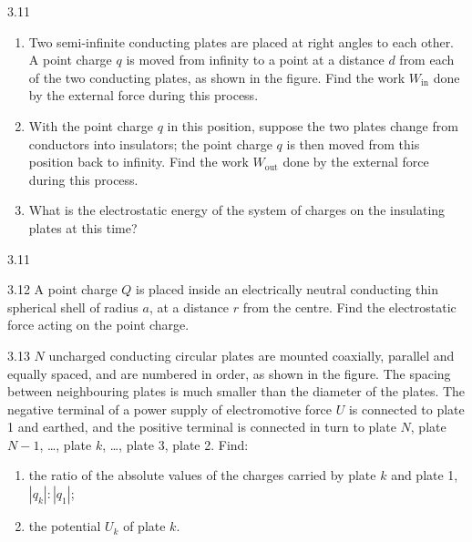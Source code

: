 \begin{problem}{3.11}
\begin{enumerate}[label=(\arabic*),leftmargin=2.2em,itemsep=1pt,topsep=2pt]
\item Two semi-infinite conducting plates are placed at right angles to each other. A point charge $q$ is moved from infinity to a point at a distance $d$ from each of the two conducting plates, as shown in the figure. Find the work $W_{\text{in}}$ done by the external force during this process.
\item With the point charge $q$ in this position, suppose the two plates change from conductors into insulators; the point charge $q$ is then moved from this position back to infinity. Find the work $W_{\text{out}}$ done by the external force during this process.
\item What is the electrostatic energy of the system of charges on the insulating plates at this time?
\end{enumerate}
\end{problem}

\begin{figbox}{3.11}
\end{figbox}

\begin{problem}{3.12}
A point charge $Q$ is placed inside an electrically neutral conducting thin spherical shell of radius $a$, at a distance $r$ from the centre. Find the electrostatic force acting on the point charge.
\end{problem}

\begin{problem}{3.13}
$N$ uncharged conducting circular plates are mounted coaxially, parallel and equally spaced, and are numbered in order, as shown in the figure. The spacing between neighbouring plates is much smaller than the diameter of the plates. The negative terminal of a power supply of electromotive force $U$ is connected to plate 1 and earthed, and the positive terminal is connected in turn to plate $N$, plate $N-1$, \dots, plate $k$, \dots, plate 3, plate 2. Find:
\begin{enumerate}[label=(\arabic*),leftmargin=2.2em,itemsep=1pt,topsep=2pt]
\item the ratio of the absolute values of the charges carried by plate $k$ and plate 1, $|q_k|:|q_1|$;
\item the potential $U_k$ of plate $k$.
\end{enumerate}
\end{problem}

